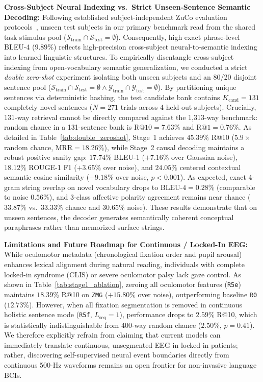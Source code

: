 \documentclass[journal]{IEEEtran}
\begin{document}
\textbf{Cross-Subject Neural Indexing vs.\ Strict Unseen-Sentence Semantic Decoding:} Following established subject-independent ZuCo evaluation protocols~\cite{wang2024cetmae, park2026lurs}, unseen test subjects in our primary benchmark read from the shared task stimulus pool ($\mathcal{S}_{\text{train}} \cap \mathcal{S}_{\text{test}} = \emptyset$). Consequently, high exact phrase-level BLEU-4 ($9.89\%$) reflects high-precision cross-subject neural-to-semantic indexing into learned linguistic structures. To empirically disentangle cross-subject indexing from open-vocabulary semantic generalization, we conducted a strict \textit{double zero-shot} experiment isolating both unseen subjects and an 80/20 disjoint sentence pool ($\mathcal{S}_{\text{train}} \cap \mathcal{S}_{\text{test}} = \emptyset \land \mathcal{Y}_{\text{train}} \cap \mathcal{Y}_{\text{test}} = \emptyset$). By partitioning unique sentences via deterministic hashing, the test candidate bank contains $K_{\text{cand}} = 131$ completely novel sentences ($N=271$ trials across 4 held-out subjects). Crucially, 131-way retrieval cannot be directly compared against the 1,313-way benchmark: random chance in a 131-sentence bank is $\text{R@10} = 7.63\%$ and $\text{R@1} = 0.76\%$. As detailed in Table~\ref{tab:double_zeroshot}, Stage~1 achieves $\mathbf{45.39\%}$ R@10 ($5.9\times$ random chance, $\text{MRR}=\mathbf{18.26\%}$), while Stage~2 causal decoding maintains a robust positive sanity gap: $\mathbf{17.74\%}$ BLEU-1 ($+\mathbf{7.16\%}$ over Gaussian noise), $\mathbf{18.12\%}$ ROUGE-1 F1 ($+\mathbf{3.65\%}$ over noise), and $\mathbf{24.05\%}$ centered contextual semantic cosine similarity ($+\mathbf{9.18\%}$ over noise, $p<0.001$). As expected, exact 4-gram string overlap on novel vocabulary drops to $\text{BLEU-4}=0.28\%$ (comparable to noise $0.56\%$), and 3-class affective polarity agreement remains near chance ($33.87\%$ vs.\ $33.33\%$ chance and $30.65\%$ noise). These results demonstrate that on unseen sentences, the decoder generates semantically coherent conceptual paraphrases rather than memorized surface strings.

\textbf{Limitations and Future Roadmap for Continuous / Locked-In EEG:} While oculomotor metadata (chronological fixation order and pupil arousal) enhances lexical alignment during natural reading, individuals with complete locked-in syndrome (CLIS) or severe oculomotor palsy lack gaze control. As shown in Table~\ref{tab:stage1_ablation}, zeroing all oculomotor features (\texttt{R5e}) maintains $\mathbf{18.39\%}$ R@10 on \texttt{ZMG} ($+\mathbf{15.80\%}$ over noise), outperforming baseline \texttt{R0} ($12.73\%$). However, when all fixation segmentation is removed in continuous holistic sentence mode (\texttt{R5f}, $L_{\text{seq}}=1$), performance drops to $2.59\%$ R@10, which is statistically indistinguishable from 400-way random chance ($2.50\%$, $p=0.41$). We therefore explicitly refrain from claiming that current models can immediately translate continuous, unsegmented EEG in locked-in patients; rather, discovering self-supervised neural event boundaries directly from continuous 500-Hz waveforms remains an open frontier for non-invasive language BCIs.
\end{document}
